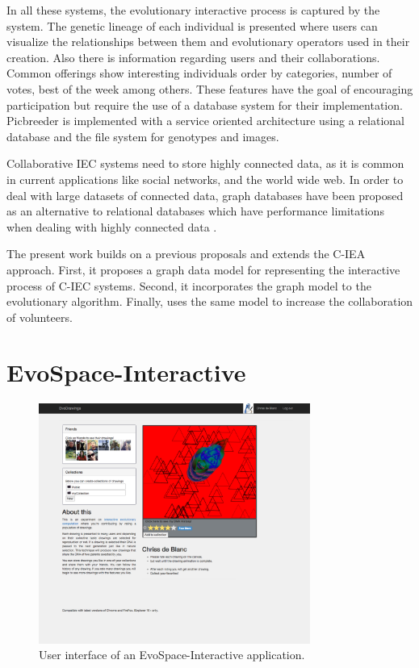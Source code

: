 \documentclass[conference]{IEEEtran}
\begin{document}
In all these systems, the evolutionary interactive process is captured by the system. The genetic lineage of each
individual is presented where users can visualize the relationships between them and evolutionary operators used in
their creation. Also there is information regarding users and their collaborations.  Common offerings show 
interesting individuals order by categories, number of votes, best of the week among others.
These features have the goal of encouraging participation but require the use of a database system 
for their implementation. Picbreeder \cite{picbreeder} is implemented with a service oriented
architecture using a relational database and the file system for genotypes and images. 

Collaborative IEC systems need to store highly connected data, as it is common in current applications
like social networks, and the world wide web. In order to deal with large datasets of connected data,
graph databases \cite{angles2012comparison} have been proposed as an alternative to relational databases 
which have performance limitations when dealing with highly connected data \cite{holzschuher2013performance}.

The present work builds on a previous proposals and extends the C-IEA approach.
First, it proposes a graph data model for representing the interactive process of C-IEC systems.
Second, it incorporates the graph model to the evolutionary algorithm.
Finally, uses the same model to increase the collaboration of volunteers.


\section{EvoSpace-Interactive}
\label{sec:evospace-i}
\begin{figure}[!t]
    \centering
        \includegraphics[width=3.5in]{img/UI_ed01.png}
    \caption{User interface of an EvoSpace-Interactive application.}
    \label{fig:web}
\end{figure}
\end{document}
